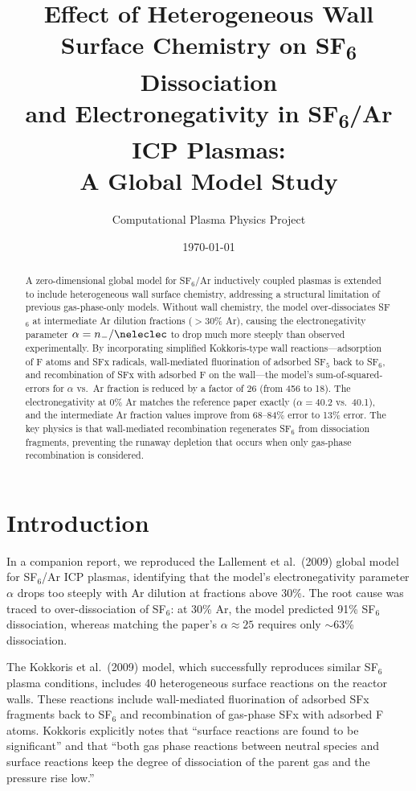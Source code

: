 \documentclass[11pt,a4paper]{article}
\title{Effect of Heterogeneous Wall Surface Chemistry on SF\textsubscript{6} Dissociation\\and Electronegativity in SF\textsubscript{6}/Ar ICP Plasmas:\\A Global Model Study}
\author{Computational Plasma Physics Project}
\date{\today}
\begin{document}
\maketitle

\begin{abstract}
A zero-dimensional global model for SF$_6$/Ar inductively coupled plasmas is extended to include heterogeneous wall surface chemistry, addressing a structural limitation of previous gas-phase-only models.  Without wall chemistry, the model over-dissociates SF$_6$ at intermediate Ar dilution fractions ($>$30\% Ar), causing the electronegativity parameter $\alpha = n_-/\neleclec$ to drop much more steeply than observed experimentally.  By incorporating simplified Kokkoris-type wall reactions---adsorption of F atoms and SFx radicals, wall-mediated fluorination of adsorbed SF$_5$ back to SF$_6$, and recombination of SFx with adsorbed F on the wall---the model's sum-of-squared-errors for $\alpha$ vs.\ Ar fraction is reduced by a factor of 26 (from 456 to 18).  The electronegativity at 0\% Ar matches the reference paper exactly ($\alpha = 40.2$ vs.\ 40.1), and the intermediate Ar fraction values improve from 68--84\% error to 13\% error.  The key physics is that wall-mediated recombination regenerates SF$_6$ from dissociation fragments, preventing the runaway depletion that occurs when only gas-phase recombination is considered.
\end{abstract}

\section{Introduction}

In a companion report, we reproduced the Lallement et al.\ (2009) global model for SF$_6$/Ar ICP plasmas, identifying that the model's electronegativity parameter $\alpha$ drops too steeply with Ar dilution at fractions above 30\%.  The root cause was traced to over-dissociation of SF$_6$: at 30\% Ar, the model predicted 91\% SF$_6$ dissociation, whereas matching the paper's $\alpha \approx 25$ requires only $\sim$63\% dissociation.

The Kokkoris et al.\ (2009) model, which successfully reproduces similar SF$_6$ plasma conditions, includes 40 heterogeneous surface reactions on the reactor walls.  These reactions include wall-mediated fluorination of adsorbed SFx fragments back to SF$_6$ and recombination of gas-phase SFx with adsorbed F atoms.  Kokkoris explicitly notes that ``surface reactions are found to be significant'' and that ``both gas phase reactions between neutral species and surface reactions keep the degree of dissociation of the parent gas and the pressure rise low.''
\end{document}
